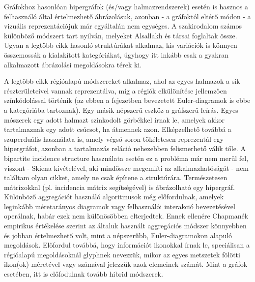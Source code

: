 Gráfokhoz hasonlóan hipergráfok (és/vagy halmazrendszerek) esetén is hasznos a felhasználó által értelmezhető ábrázolásuk, azonban - a gráfoktól eltérő módon - a vizuális reprezentációjuk már egyáltalán nem egységes. A szakirodalom számos különböző módszert tart nyilván, melyeket Alsallakh és társai foglaltak össze\cite{alsallakah2016_the_state_of_the_art_set_visualization}. Ugyan a legtöbb cikk hasonló struktúrákat alkalmaz, kis variációk is könnyen összemossák a kialakított kategóriákat, úgyhogy itt inkább csak a gyakran alkalmazott ábrázolási megoldásokra térek ki.


A legtöbb cikk régióalapú módszereket alkalmaz, ahol az egyes halmazok a sík részterületeivel vannak reprezentálva, míg a régiók elkülönítése jellemzően színkódolással történik\cite{eulerape, euler_polygon_article, simonetto_undrawable} (az ebben a fejezetben bevezetett Euler-diagramok is ebbe a kategóriába tartoznak). Egy másik népszerű eszköz a gráfszerű leírás. Egyes mószerek egy adott halmazt színkodolt görbékkel írnak le, amelyek akkor tartalmaznak egy adott csúcsot, ha átmennek azon\cite{linesets}. Elképzelhető továbbá a szuperduális használata is, amely végső soron tökéletesen reprezentál egy hipergráfot, azonban a tartalmazás reláció nehezebben felismerhető válik tőle. A bipartite incidence structure használata esetén ez a probléma már nem merül fel, viszont - Skiena kivételével, aki mindössze megemlíti az alkalmazhatóságát\cite{bpis_vis} - nem találtam olyan cikket, amely ne csak építene a struktúrára. Természetesen mátrixokkal (pl. incidencia mátrix segítségével) is ábrázolható egy hipergráf. Különböző aggregációt használó algoritmusok még előfordulnak, amelyek leginkább méretarányos diagramok vagy felhasználói interakció bevezetésével operálnak\cite{wellmatched_important, interactive_sets}, habár ezek nem különösöbben elterjedtek. Ennek ellenére Chapmanék empirikus értékelése szerint az általuk használt aggregációs módszer könnyebben és jobban értelmezhető volt, mint a népszerűbb, Euler-diagramokon alapuló megoldások\cite{wellmatched_important}. Előfordul továbbá, hogy információt ikonokkal írnak le, speciálisan a régióalapú megoldásoknál glyphnek nevezzük, mikor az egyes metszetek fölötti ikon(ok) méretével vagy számával jelezzük azok elemeinek számát. Mint a gráfok esetében, itt is előfodulnak tovább hibrid módszerek.



